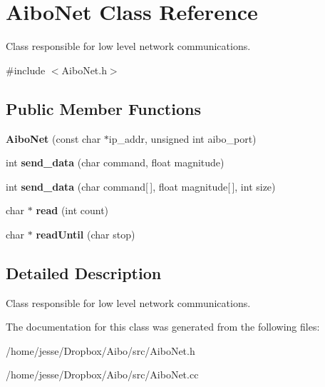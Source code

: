 \hypertarget{classAiboNet}{
\section{AiboNet Class Reference}
\label{classAiboNet}
}


Class responsible for low level network communications.  


{\ttfamily \#include $<$AiboNet.h$>$}\subsection*{Public Member Functions}
\begin{DoxyCompactItemize}
\item 
\hypertarget{classAiboNet_ae2866fb8db1d5afb44a26279f3678106}{
{\bfseries AiboNet} (const char $\ast$ip\_\-addr, unsigned int aibo\_\-port)}
\label{classAiboNet_ae2866fb8db1d5afb44a26279f3678106}

\item 
\hypertarget{classAiboNet_abec9a724fac2faba709b4b7ffff98b20}{
int {\bfseries send\_\-data} (char command, float magnitude)}
\label{classAiboNet_abec9a724fac2faba709b4b7ffff98b20}

\item 
\hypertarget{classAiboNet_aabeeda24d755f9963eabe94fe5be8168}{
int {\bfseries send\_\-data} (char command\mbox{[}$\,$\mbox{]}, float magnitude\mbox{[}$\,$\mbox{]}, int size)}
\label{classAiboNet_aabeeda24d755f9963eabe94fe5be8168}

\item 
\hypertarget{classAiboNet_aaafd2d9a66c4e5483452af2ffe0bb13b}{
char $\ast$ {\bfseries read} (int count)}
\label{classAiboNet_aaafd2d9a66c4e5483452af2ffe0bb13b}

\item 
\hypertarget{classAiboNet_ae00d09ceee6bece904ff24fcf7f8a180}{
char $\ast$ {\bfseries readUntil} (char stop)}
\label{classAiboNet_ae00d09ceee6bece904ff24fcf7f8a180}

\end{DoxyCompactItemize}


\subsection{Detailed Description}
Class responsible for low level network communications. 

The documentation for this class was generated from the following files:\begin{DoxyCompactItemize}
\item 
/home/jesse/Dropbox/Aibo/src/AiboNet.h\item 
/home/jesse/Dropbox/Aibo/src/AiboNet.cc\end{DoxyCompactItemize}
